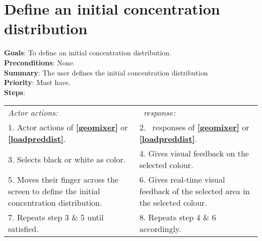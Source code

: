   \section{Define an initial concentration distribution}
  \label{initdist}
  \textbf{Goals}: To define an initial concentration distribution.\\
  \textbf{Preconditions}: None. \\ %
  \textbf{Summary}: The user defines the initial concentration distribution\\
  \textbf{Priority}: Must have.\\
  \textbf{Steps}: \\
  \begin{tabular}{ p{} p{} }
  	\emph{Actor actions:} & \emph{\projectname\ response:} \\
  	1. Actor actions of \textbf{\ref{geomixer}} or  \textbf{\ref{loadpreddist}}. & 2. \projectname\ responses of \textbf{\ref{geomixer}} or  \textbf{\ref{loadpreddist}}.\\
	3. Selects black or white as color. & 4. Gives visual feedback on the selected colour. \\
	5. Moves their finger across the screen to define the initial concentration distribution. & 6. Gives real-time visual feedback of the selected area in the selected colour.\\
    7. Repeats step 3 \& 5 until satisfied. & 8.	Repeats step 4 \& 6 accordingly. \\
      \end{tabular}
      
